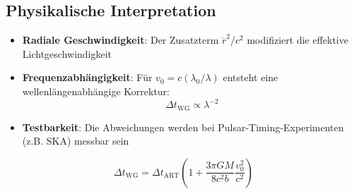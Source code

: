 \subsection{Physikalische Interpretation}
\begin{itemize}
\item \textbf{Radiale Geschwindigkeit}: Der Zusatzterm $\dot{r}^2/c^2$ modifiziert die effektive Lichtgeschwindigkeit
\item \textbf{Frequenzabhängigkeit}: Für $v_0 = c(\lambda_0/\lambda)$ entsteht eine wellenlängenabhängige Korrektur:
  \[
  \Delta t_\text{WG} \propto \lambda^{-2}
  \]
\item \textbf{Testbarkeit}: Die Abweichungen werden bei Pulsar-Timing-Experimenten (z.B. SKA) messbar sein
\end{itemize}

\begin{equation}
\boxed{
\Delta t_\text{WG} = \Delta t_\text{ART}\left(1 + \frac{3\pi GM}{8c^2b}\frac{v_0^2}{c^2}\right)
}
\end{equation}